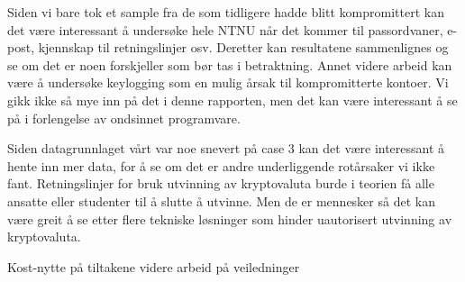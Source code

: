 Siden vi bare tok et sample fra de som tidligere hadde blitt kompromittert kan det være interessant å undersøke hele NTNU når det kommer til passordvaner, e-post, kjennskap til retningslinjer osv. Deretter kan resultatene sammenlignes og se om det er noen forskjeller som bør tas i betraktning. Annet videre arbeid kan være å undersøke keylogging som en mulig årsak til kompromitterte kontoer. Vi gikk ikke så mye inn på det i denne rapporten, men det kan være interessant å se på i forlengelse av ondsinnet programvare. 

Siden datagrunnlaget vårt var noe snevert på case 3 kan det være interessant å hente inn mer data, for å se om det er andre underliggende rotårsaker vi ikke fant. Retningslinjer for bruk utvinning av kryptovaluta burde i teorien få alle ansatte eller studenter til å slutte å utvinne. Men de er mennesker så det kan være greit å se etter flere tekniske løsninger som hinder uautorisert utvinning av kryptovaluta. 

Kost-nytte på tiltakene
videre arbeid på veiledninger
